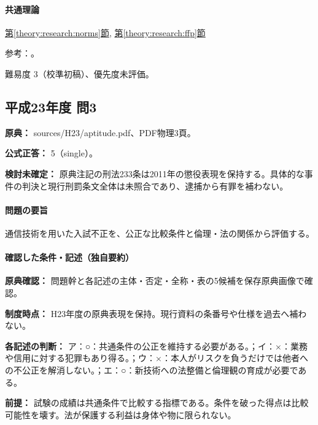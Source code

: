 \paragraph{共通理論} \hyperref[theory:research:norms]{第\ref*{theory:research:norms}節}, \hyperref[theory:research:ffp]{第\ref*{theory:research:ffp}節}

\par 参考：\cite{scj_code2006}。

\par 難易度 3（校準初稿）、優先度未評価。

\subsection{平成23年度 問3}
\label{q:h23-reg-apt-03}

\noindent\textbf{原典：} sources/H23/aptitude.pdf、PDF物理3頁。

\textbf{公式正答：} 5（single）。

\par\textbf{検討未確定：} 原典注記の刑法233条は2011年の懲役表現を保持する。具体的な事件の判決と現行刑罰条文全体は未照合であり、逮捕から有罪を補わない。

\paragraph{問題の要旨} 通信技術を用いた入試不正を、公正な比較条件と倫理・法の関係から評価する。

\paragraph{確認した条件・記述（独自要約）}\mbox{}\par

\noindent\textbf{原典確認：} 問題幹と各記述の主体・否定・全称・表の5候補を保存原典画像で確認。\par

\noindent\textbf{制度時点：} H23年度の原典表現を保持。現行資料の条番号や仕様を過去へ補わない。\par

\noindent\textbf{各記述の判断：} ア：○：共通条件の公正を維持する必要がある。；イ：×：業務や信用に対する犯罪もあり得る。；ウ：×：本人がリスクを負うだけでは他者への不公正を解消しない。；エ：○：新技術への法整備と倫理観の育成が必要である。\par

\noindent\textbf{前提：} 試験の成績は共通条件で比較する指標である。条件を破った得点は比較可能性を壊す。法が保護する利益は身体や物に限られない。\par


